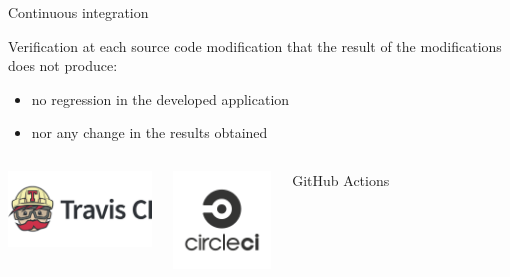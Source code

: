 \begin{frame}{Continuous integration}

Verification at each source code modification that the result of the modifications does not produce:
\begin{itemize}
    \item no regression in the developed application
    \item nor any change in the results obtained
\end{itemize}
\begin{columns}
\begin{center}
    \href{https://docs.travis-ci.com/user/tutorial/}{\includegraphics[height=2cm]{09_conclusion/images/FAIR_travisCI_logo.png}}
\end{center}
\begin{center}
    \href{https://circleci.com/integrations/github/}{\includegraphics[height=2.6cm]{09_conclusion/images/FAIR_CircleCI_logo.png}}
\end{center}
GitHub Actions
\end{columns}
 \end{frame}
 

